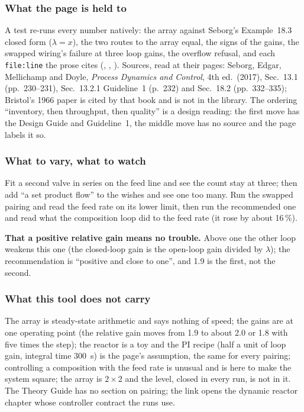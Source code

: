 \documentclass[11pt,a4paper]{article}
\begin{document}
\subsubsection*{What the page is held to}

A test re-runs every number natively: the array against Seborg's Example~18.3
closed form ($\lambda=x$), the two routes to the array equal, the signs of the
gains, the swapped wiring's failure at three loop gains, the overflow
refusal, and each \texttt{file:line} the prose cites (,
, ).  Sources, read at
their pages: Seborg, Edgar, Mellichamp and Doyle, \emph{Process Dynamics and
Control}, 4th ed.\ (2017), Sec.~13.1 (pp.~230--231), Sec.~13.2.1 Guideline~1
(p.~232) and Sec.~18.2 (pp.~332--335); Bristol's 1966 paper is cited by that
book and is not in the library.  The ordering ``inventory, then throughput,
then quality'' is a design reading: the first move has the Design Guide and
Guideline~1, the middle move has no source and the page labels it so.

\subsubsection*{What to vary, what to watch}

\begin{tryit}
Fit a second valve in series on the feed line and see the count stay at three;
then add ``a set product flow'' to the wishes and see one too many.  Run the
swapped pairing and read the feed rate on its lower limit, then run the
recommended one and read what the composition loop did to the feed rate (it
rose by about 16\,\%).
\end{tryit}

\begin{pitfall}
\textbf{That a positive relative gain means no trouble.}  Above one the other
loop weakens this one (the closed-loop gain is the open-loop gain divided by
$\lambda$); the recommendation is ``positive and close to one'', and 1.9 is
the first, not the second.
\end{pitfall}

\subsubsection*{What this tool does not carry}

The array is steady-state arithmetic and says nothing of speed; the gains are at
one operating point (the relative gain moves from 1.9 to about 2.0 or 1.8 with
five times the step); the reactor is a toy and the PI recipe (half a unit of loop
gain, integral time 300~s) is the page's assumption, the same for every
pairing; controlling a composition with the feed rate is unusual and is here to
make the system square; the array is $2\times2$ and the level, closed in every
run, is not in it.  The Theory Guide has no section on pairing; the link opens
the dynamic reactor chapter whose controller contract the runs use.
\end{document}
